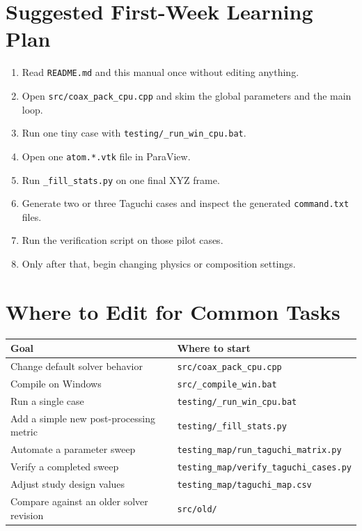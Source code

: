 \documentclass[11pt]{article}
\begin{document}
\section{Suggested First-Week Learning Plan}

\begin{enumerate}
  \item Read \texttt{README.md} and this manual once without editing anything.
  \item Open \texttt{src/coax\_pack\_cpu.cpp} and skim the global parameters and the main loop.
  \item Run one tiny case with \texttt{testing/\_run\_win\_cpu.bat}.
  \item Open one \texttt{atom.*.vtk} file in ParaView.
  \item Run \texttt{\_fill\_stats.py} on one final XYZ frame.
  \item Generate two or three Taguchi cases and inspect the generated \texttt{command.txt} files.
  \item Run the verification script on those pilot cases.
  \item Only after that, begin changing physics or composition settings.
\end{enumerate}

\section{Where to Edit for Common Tasks}

\begin{longtable}{p{}p{}}
\toprule
\textbf{Goal} & \textbf{Where to start} \\
\midrule
\endhead
Change default solver behavior & \texttt{src/coax\_pack\_cpu.cpp} \\
Compile on Windows & \texttt{src/\_compile\_win.bat} \\
Run a single case & \texttt{testing/\_run\_win\_cpu.bat} \\
Add a simple new post-processing metric & \texttt{testing/\_fill\_stats.py} \\
Automate a parameter sweep & \texttt{testing\_map/run\_taguchi\_matrix.py} \\
Verify a completed sweep & \texttt{testing\_map/verify\_taguchi\_cases.py} \\
Adjust study design values & \texttt{testing\_map/taguchi\_map.csv} \\
Compare against an older solver revision & \texttt{src/old/} \\
\bottomrule
\end{longtable}
\end{document}
